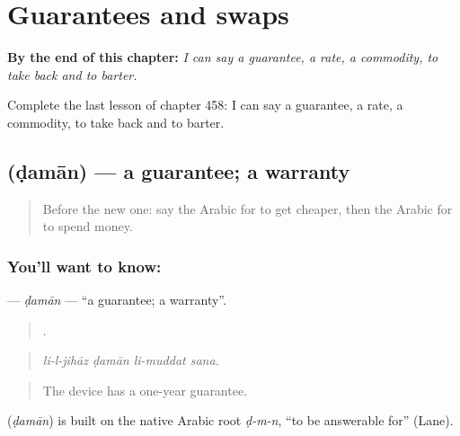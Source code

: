 
\chapter{Guarantees and swaps}
\label{ch:ar-guarantees-and-swaps}

\begin{chapteropening}
\textbf{By the end of this chapter:} \emph{I can say a guarantee, a rate, a commodity, to take back and to barter.}

Complete the last lesson of chapter 458: I can say a guarantee, a rate, a commodity, to take back and to barter.
\end{chapteropening}

\section[\texorpdfstring{\ar{ضمان} (ḍamān)}{ضمان (ḍamān)}]{ (ḍamān) — a guarantee; a warranty}

\label{lesson:AR-C458-daman}



\begin{quote}
Before the new one: say the Arabic for to get cheaper, then the Arabic for to spend money.
\end{quote}

\subsection*{You'll want to know: }
\textbf{} — \emph{ḍamān} — \textquotedblleft{}a guarantee; a warranty\textquotedblright{}.

\begin{quote}
   .
\end{quote}

\begin{quote}
\emph{li-l-jihāz ḍamān li-muddat sana.}
\end{quote}

\begin{quote}
The device has a one-year guarantee.
\end{quote}

\begin{cousinweb}
\textbf{} (\emph{ḍamān}) is built on the native Arabic root \emph{ḍ-m-n}, \textquotedblleft{}to be answerable for\textquotedblright{} (Lane).
\end{cousinweb}

